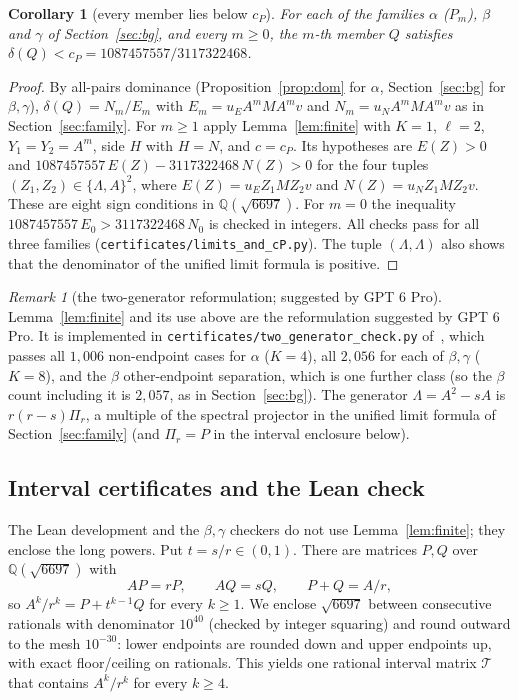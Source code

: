 \documentclass[11pt]{amsart}
\newtheorem{corollary}[theorem]{Corollary}
\theoremstyle{definition}
\theoremstyle{remark}
\newtheorem{remark}[theorem]{Remark}
\begin{document}
\begin{corollary}[every member lies below $c_P$]\label{cor:cp}
For each of the families $\alpha$ ($P_m$), $\beta$ and $\gamma$ of Section~\ref{sec:bg}, and every $m\ge0$, the $m$-th member $Q$ satisfies $\delta(Q)<c_P=1087457557/3117322468$.
\end{corollary}
\begin{proof}
By all-pairs dominance (Proposition~\ref{prop:dom} for $\alpha$, Section~\ref{sec:bg} for $\beta,\gamma$), $\delta(Q)=N_m/E_m$ with $E_m=u_EA^mMA^mv$ and $N_m=u_NA^mMA^mv$ as in Section~\ref{sec:family}. For $m\ge1$ apply Lemma~\ref{lem:finite} with $K=1$, $\ell=2$, $Y_1=Y_2=A^m$, side $H$ with $H=N$, and $c=c_P$. Its hypotheses are $E(Z)>0$ and $1087457557\,E(Z)-3117322468\,N(Z)>0$ for the four tuples $(Z_1,Z_2)\in\{\Lambda,A\}^2$, where $E(Z)=u_EZ_1MZ_2v$ and $N(Z)=u_NZ_1MZ_2v$. These are eight sign conditions in $\mathbb{Q}(\sqrt{6697})$. For $m=0$ the inequality $1087457557\,E_0>3117322468\,N_0$ is checked in integers. All checks pass for all three families (\texttt{certificates/limits\_and\_cP.py}). The tuple $(\Lambda,\Lambda)$ also shows that the denominator of the unified limit formula is positive.
\end{proof}

\begin{remark}[the two-generator reformulation; suggested by GPT 6 Pro]\label{rem:twogen}
Lemma~\ref{lem:finite} and its use above are the reformulation suggested by GPT 6 Pro. It is implemented in \texttt{certificates/two\_generator\_check.py} of~\cite{repo}, which passes all $1{,}006$ non-endpoint cases for $\alpha$ ($K=4$), all $2{,}056$ for each of $\beta,\gamma$ ($K=8$), and the $\beta$ other-endpoint separation, which is one further class (so the $\beta$ count including it is $2{,}057$, as in Section~\ref{sec:bg}). The generator $\Lambda=A^2-sA$ is $r(r-s)\Pi_r$, a multiple of the spectral projector in the unified limit formula of Section~\ref{sec:family} (and $\Pi_r=P$ in the interval enclosure below).
\end{remark}

\subsection*{Interval certificates and the Lean check}
The Lean development and the $\beta,\gamma$ checkers do not use Lemma~\ref{lem:finite}; they enclose the long powers. Put $t=s/r\in(0,1)$. There are matrices $P,Q$ over $\mathbb{Q}(\sqrt{6697})$ with
\[
AP=rP,\qquad AQ=sQ,\qquad P+Q=A/r ,
\]
so $A^k/r^k=P+t^{k-1}Q$ for every $k\ge1$. We enclose $\sqrt{6697}$ between consecutive rationals with denominator $10^{40}$ (checked by integer squaring) and round outward to the mesh $10^{-30}$: lower endpoints are rounded down and upper endpoints up, with exact floor/ceiling on rationals. This yields one rational interval matrix $\mathcal T$ that contains $A^k/r^k$ for every $k\ge4$.
\end{document}
